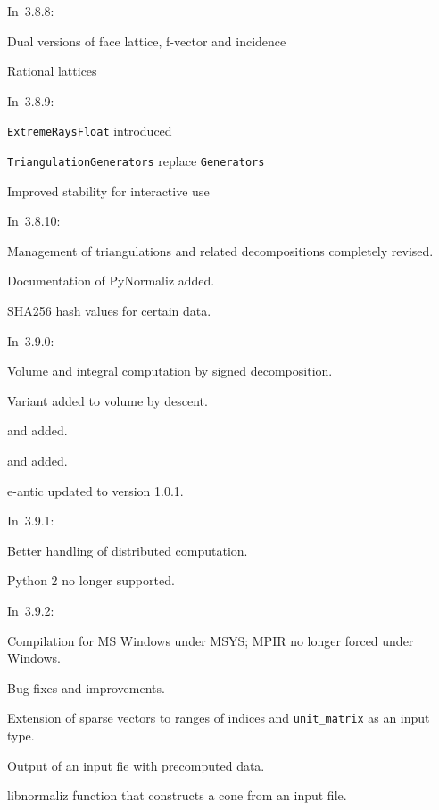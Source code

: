 In~3.8.8:

\begin{arab}
	\item Dual versions of face lattice, f-vector and incidence
	\item Rational lattices
\end{arab}

In~3.8.9:

\begin{arab}
	\item \verb|ExtremeRaysFloat| introduced
	\item \verb|TriangulationGenerators| replace \verb|Generators|
	\item Improved stability for interactive use
\end{arab}

In~3.8.10:

\begin{arab}
	\item Management of triangulations and related decompositions completely revised.
	\item Documentation of PyNormaliz added.
	\item SHA256 hash values for certain data.
\end{arab}

In~3.9.0:

\begin{arab}
	\item Volume and integral computation by signed decomposition.
	\item Variant  added to volume by descent.
	\item {} and  added.
	\item {} and  added.
	\item e-antic updated to version 1.0.1.
\end{arab}

In~3.9.1:

\begin{arab}
	\item Better handling of distributed computation.
	\item Python 2 no longer supported.
\end{arab}

In~3.9.2:

\begin{arab}
	\item Compilation for MS Windows under MSYS; MPIR no longer forced under Windows.
	\item Bug fixes and improvements.
	\item Extension of sparse vectors to ranges of indices and \verb|unit_matrix| as an input type.
	\item Output of an input fie with precomputed data.
	\item libnormaliz function that constructs a cone from an input file.
\end{arab}


